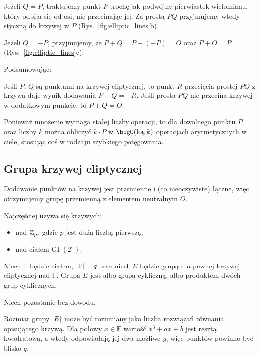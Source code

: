 Jeżeli \( Q = P \), traktujemy punkt \( P \) trochę jak podwójny pierwiastek wielomianu, który odbija się od osi, nie przecinając jej.
Za prostą \( PQ \) przyjmujemy wtedy styczną do krzywej w \( P \) (Rys.~\ref{fig:elliptic_lines}b).

Jeżeli \( Q = -P \), przyjmujemy, że \( P + Q = P + (-P) = O \) oraz \(P + O = P \) (Rys.~\ref{fig:elliptic_lines}c).

Podsumowując:
\begin{definition}[Dodawanie]
	Jeśli \( P \), \( Q \) są punktami na krzywej eliptycznej, to punkt \( R \) przecięcia prostej \( PQ \) z krzywą daje wynik dodawania \( P + Q = -R \).
	Jeśli prosta \( PQ \) nie przecina krzywej w dodatkowym punkcie, to \( P + Q = O \).
\end{definition}

Ponieważ mnożenie wymaga stałej liczby operacji, to dla dowolnego punktu \( P \) oraz liczby \( k \) można obliczyć \( k \cdot P \) w \( \bigO(\log k) \) operacjach arytmetycznych w ciele, stosując coś w rodzaju szybkiego potęgowania.

\subsection{Grupa krzywej eliptycznej}
Dodawanie punktów na krzywej jest przemienne i (co nieoczywiste) łączne, więc otrzymujemy grupę przemienną z elementem neutralnym \( O \).

Najczęściej używa się krzywych:
\begin{itemize}
	\item nad \( \mathbb{Z}_p \), gdzie \( p \) jest dużą liczbą pierwszą,
	\item nad ciałem \( \text{GF}(2^s) \).
\end{itemize}

\begin{theorem}
	Niech \( \mathbb{F} \) będzie ciałem, \( \left\lvert\mathbb{F}\right\rvert = q \) oraz niech \( E \) będzie grupą dla pewnej krzywej eliptycznej nad \( \mathbb{F} \). Grupa \( E \) jest albo grupą cykliczną, albo produktem dwóch grup cyklicznych.
\end{theorem}
Niech pozostanie bez dowodu.

Rozmiar grupy \( \left\lvert E\right\rvert \) może być rozumiany jako liczba rozwiązań równania opisującego krzywą.
Dla połowy \( x \in \mathbb{F} \) wartość \( x^3 + ax + b \) jest resztą kwadratową, a wtedy odpowiadają jej dwa możliwe \( y \), więc punktów powinno być blisko \( q \).